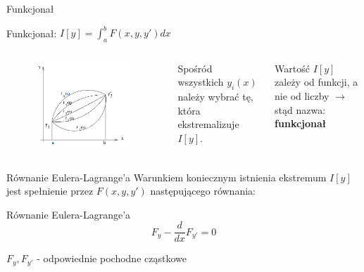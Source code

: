 	\begin{frame}{Funkcjonał}
		\begin{block}{Funkcjonał:}
			$I[y] = \int_a^b F(x,y,y') dx$
		\end{block}		
		\begin{columns}
				\begin{figure}
					\includegraphics[width=1.2\textwidth]{img/19/functional}
				\end{figure}
				Spośród wszystkich $y_i(x)$ należy wybrać tę, która ekstremalizuje $I[y]$.
					
				Wartość $I[y]$ zależy od funkcji, a nie od liczby $\rightarrow$ stąd nazwa: \textbf{funkcjonał}
		\end{columns}	
		
		
		
	\end{frame}
	

	\begin{frame}{Równanie Eulera-Lagrange'a}
		Warunkiem koniecznym istnienia ekstremum $I[y]$ jest spełnienie przez $F(x,y,y')$ następującego równania:
		
		\begin{block}{Równanie Eulera-Lagrange'a}
			$$
			F_y - \frac{d}{dx} F_{y'} = 0
			$$
			
			$F_y , F_{y'}$ - odpowiednie pochodne cząstkowe
		\end{block}
		
		
		
	\end{frame}

